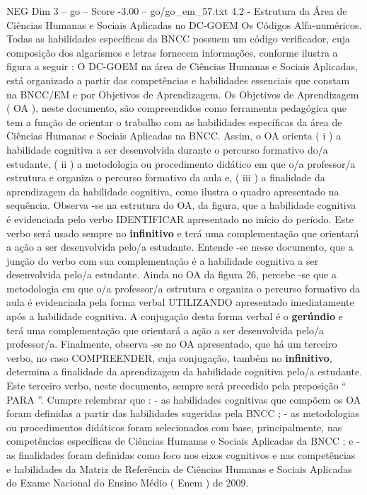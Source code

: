 \begin{textsample}{NEG Dim 3 – go – Score -3.00 – go/go\_em\_57.txt}  \label{ex:f3_neg_242}
4.2 - Estrutura da Área de Ciências Humanas e Sociais Aplicadas no DC-GOEM Os Códigos Alfa-numéricos.
Todas as habilidades específicas da BNCC possuem um código verificador, cuja composição dos algarismos e letras fornecem informações, conforme ilustra a figura a seguir : O DC-GOEM na área de Ciências Humanas e Sociais Aplicadas, está organizado a partir das competências e habilidades essenciais que constam na BNCC/EM e por Objetivos de Aprendizagem.
Os Objetivos de Aprendizagem ( OA ), neste documento, são compreendidos como ferramenta pedagógica que tem a função de orientar o trabalho com as habilidades específicas da área de Ciências Humanas e Sociais Aplicadas na BNCC.
Assim, o OA orienta ( i ) a habilidade cognitiva a ser desenvolvida durante o percurso formativo do/a estudante, ( ii ) a metodologia ou procedimento didático em que o/a professor/a estrutura e organiza o percurso formativo da aula e, ( iii ) a finalidade da aprendizagem da habilidade cognitiva, como ilustra o quadro apresentado na sequência.
Observa -se na estrutura do OA, da figura, que a habilidade cognitiva é evidenciada pelo verbo IDENTIFICAR apresentado no início do período.
Este verbo será usado sempre no \textbf{infinitivo} e terá uma complementação que orientará a ação a ser desenvolvida pelo/a estudante.
Entende -se nesse documento, que a junção do verbo com sua complementação é a habilidade cognitiva a ser desenvolvida pelo/a estudante.
Ainda no OA da figura 26, percebe -se que a metodologia em que o/a professor/a estrutura e organiza o percurso formativo da aula é evidenciada pela forma verbal UTILIZANDO apresentado imediatamente após a habilidade cognitiva.
A conjugação desta forma verbal é o \textbf{gerúndio} e terá uma complementação que orientará a ação a ser desenvolvida pelo/a professor/a.
Finalmente, observa -se no OA apresentado, que há um terceiro verbo, no caso COMPREENDER, cuja conjugação, também no \textbf{infinitivo}, determina a finalidade da aprendizagem da habilidade cognitiva pelo/a estudante.
Este terceiro verbo, neste documento, sempre será precedido pela preposição “ PARA ”.
Cumpre relembrar que : - as habilidades cognitivas que compõem os OA foram definidas a partir das habilidades sugeridas pela BNCC ; - as metodologias ou procedimentos didáticos foram selecionados com base, principalmente, nas competências específicas de Ciências Humanas e Sociais Aplicadas da BNCC ; e - as finalidades foram definidas como foco nos eixos cognitivos e nas competências e habilidades da Matriz de Referência de Ciências Humanas e Sociais Aplicadas do Exame Nacional do Ensino Médio ( Enem ) de 2009.

\end{textsample}
